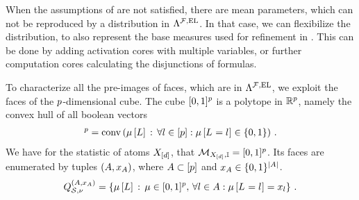When the assumptions of  are not satisfied, there are mean parameters, which can not be reproduced by a distribution in $\Lambda^{\mathcal{F},\mathrm{EL}}$.
In that case, we can flexibilize the distribution, to also represent the base measures used for refinement in .
This can be done by adding activation cores with multiple variables, or further computation cores calculating the disjunctions of formulas.



To characterize all the pre-images of faces, which are in $\Lambda^{\mathcal{F},\mathrm{EL}}$, we exploit the faces of the $p$-dimensional cube.
The cube $[0,1]^{p}$ is a polytope in $\mathbb{R}^{p}$, namely the convex hull of all boolean vectors
\begin{align*}
	[0,1]^{\seldim} = \convhullof{\meanparamat{\selvariable}\wcols\uniquantwrtof{\selindexin}{\meanparamat{\indexedselvariable}\in\{0,1\}}} \, .
\end{align*}
We have for the statistic of atoms $X_{[d]}$, that $\mathcal{M}_{X_{[d]},\mathbb{I}}=[0,1]^{p}$.
Its faces are enumerated by tuples $(A,x_{A})$, where $A\subset[p]$ and $x_{A}\in\{0,1\}^{\left|A\right|}$.
\begin{align*}
	Q^{(A,x_{A})}_{\mathcal{S},\nu}
	= \left\{\mu\left[L\right]\,:\, \mu\in[0,1]^{p},\,\forall{l\in A}:{\mu\left[L_{}=l_{}\right]=x_{l}}\right\} \, .
\end{align*}


